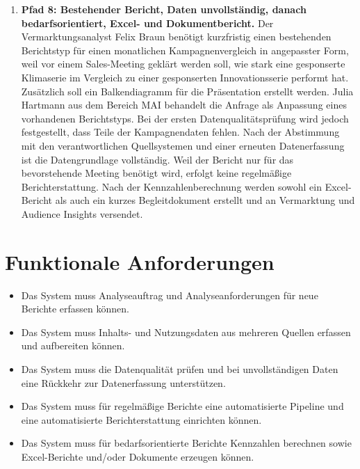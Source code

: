 \documentclass[11pt,a4paper]{article}
\begin{document}
\begin{enumerate}
  \item \textbf{Pfad 8: Bestehender Bericht, Daten unvollständig, danach bedarfsorientiert, Excel- und Dokumentbericht.} Der Vermarktungsanalyst Felix Braun ben\"otigt kurzfristig einen bestehenden Berichtstyp f\"ur einen monatlichen Kampagnenvergleich in angepasster Form, weil vor einem Sales-Meeting gekl\"art werden soll, wie stark eine gesponserte Klimaserie im Vergleich zu einer gesponserten Innovationsserie performt hat. Zus\"atzlich soll ein Balkendiagramm f\"ur die Pr\"asentation erstellt werden. Julia Hartmann aus dem Bereich MAI behandelt die Anfrage als Anpassung eines vorhandenen Berichtstyps. Bei der ersten Datenqualit\"atspr\"ufung wird jedoch festgestellt, dass Teile der Kampagnendaten fehlen. Nach der Abstimmung mit den verantwortlichen Quellsystemen und einer erneuten Datenerfassung ist die Datengrundlage vollst\"andig. Weil der Bericht nur f\"ur das bevorstehende Meeting ben\"otigt wird, erfolgt keine regelm\"a{\ss}ige Berichterstattung. Nach der Kennzahlenberechnung werden sowohl ein Excel-Bericht als auch ein kurzes Begleitdokument erstellt und an Vermarktung und Audience Insights versendet.
\end{enumerate}

\section{Funktionale Anforderungen}
\begin{itemize}
  \item Das System muss Analyseauftrag und Analyseanforderungen f\"ur neue Berichte erfassen k\"onnen.
  \item Das System muss Inhalts- und Nutzungsdaten aus mehreren Quellen erfassen und aufbereiten k\"onnen.
  \item Das System muss die Datenqualit\"at pr\"ufen und bei unvollst\"andigen Daten eine R\"uckkehr zur Datenerfassung unterst\"utzen.
  \item Das System muss f\"ur regelm\"a{\ss}ige Berichte eine automatisierte Pipeline und eine automatisierte Berichterstattung einrichten k\"onnen.
  \item Das System muss f\"ur bedarfsorientierte Berichte Kennzahlen berechnen sowie Excel-Berichte und/oder Dokumente erzeugen k\"onnen.
\end{itemize}
\end{document}
